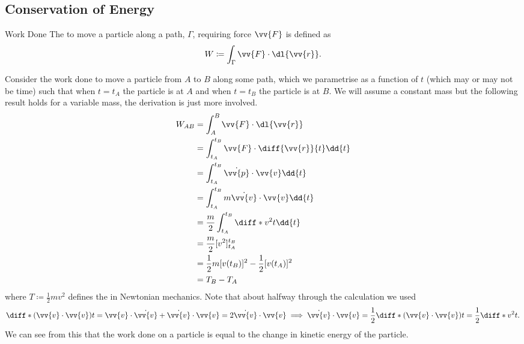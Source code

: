 \documentclass[fleqn]{NotesClass}
\begin{document}
    \subsection{Conservation of Energy}
    \begin{dfn}{Work Done}{}
        The  to move a particle along a path, \(\Gamma\), requiring force \(\vv{F}\) is defined as
        \begin{equation}
            W\coloneqq \int_\Gamma \vv{F}\cdot\dl{\vv{r}}.
        \end{equation}
    \end{dfn}
    
    Consider the work done to move a particle from \(A\) to \(B\) along some path, which we parametrise as a function of \(t\) (which may or may not be time) such that when \(t = t_A\) the particle is at \(A\) and when \(t = t_B\) the particle is at \(B\).
    We will assume a constant mass but the following result holds for a variable mass, the derivation is just more involved.
    \begin{align}
        W_{AB} &= \int_A^B \vv{F}\cdot\dl{\vv{r}}\\
        &= \int_{t_A}^{t_B} \vv{F} \cdot\diff{\vv{r}}{t}\dd{t}\\
        &= \int_{t_A}^{t_B} \dot{\vv{p}}\cdot\vv{v}\dd{t}\\
        &= \int_{t_A}^{t_B} m\dot{\vv{v}}\cdot\vv{v}\dd{t}\\
        &= \frac{m}{2}\int_{t_A}^{t_B} \diff*{v^2}{t} \dd{t}\\
        &= \frac{m}{2}[v^2]_{t_A}^{t_B}\\
        &= \frac{1}{2}m[v(t_B)]^2 - \frac{1}{2}[v(t_A)]^2\\
        &= T_{B} - T_{A}\label{eqn:W=Tb-Ta}
    \end{align}
    where \(T\coloneqq \frac{1}{2}mv^2\) defines the  in Newtonian mechanics.
    Note that about halfway through the calculation we used
    \begin{equation}
        \diff*{(\vv{v}\cdot\vv{v})}{t} = \vv{v}\cdot\dot{\vv{v}} + \dot{\vv{v}}\cdot\vv{v} = 2\dot{\vv{v}}\cdot\vv{v} \implies \dot{\vv{v}}\cdot\vv{v} = \frac{1}{2}\diff*{(\vv{v}\cdot\vv{v})}{t} = \frac{1}{2}\diff*{v^2}{t}.
    \end{equation}
    We can see from this that the work done on a particle is equal to the change in kinetic energy of the particle.
    
\end{document}
